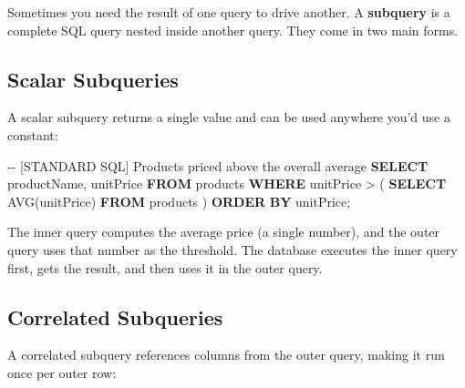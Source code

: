 \documentclass[
  letterpaper,
  DIV=11,
  numbers=noendperiod]{scrreprt}
\newenvironment{Shaded}{\begin{snugshade}}{\end{snugshade}}
\newcommand{\CommentTok}[1]{\textcolor[rgb]{0.37,0.37,0.37}{#1}}
\newcommand{\FunctionTok}[1]{\textcolor[rgb]{0.28,0.35,0.67}{#1}}
\newcommand{\KeywordTok}[1]{\textcolor[rgb]{0.00,0.23,0.31}{\textbf{#1}}}
\newcommand{\NormalTok}[1]{\textcolor[rgb]{0.00,0.23,0.31}{#1}}
\newcommand{\OperatorTok}[1]{\textcolor[rgb]{0.37,0.37,0.37}{#1}}
\begin{document}
Sometimes you need the result of one query to drive another. A
\textbf{subquery} is a complete SQL query nested inside another query.
They come in two main forms.

\subsection{Scalar Subqueries}\label{scalar-subqueries}

A scalar subquery returns a single value and can be used anywhere you'd
use a constant:

\begin{codelisting}

\caption{\texttt{duckdb}}

\begin{Shaded}
\begin{Highlighting}[]
\CommentTok{{-}{-} [STANDARD SQL] Products priced above the overall average}
\KeywordTok{SELECT}
\NormalTok{    productName,}
\NormalTok{    unitPrice}
\KeywordTok{FROM}\NormalTok{ products}
\KeywordTok{WHERE}\NormalTok{ unitPrice }\OperatorTok{\textgreater{}}\NormalTok{ (}
    \KeywordTok{SELECT} \FunctionTok{AVG}\NormalTok{(unitPrice) }\KeywordTok{FROM}\NormalTok{ products}
\NormalTok{)}
\KeywordTok{ORDER} \KeywordTok{BY}\NormalTok{ unitPrice;}
\end{Highlighting}
\end{Shaded}

\end{codelisting}

The inner query computes the average price (a single number), and the
outer query uses that number as the threshold. The database executes the
inner query first, gets the result, and then uses it in the outer query.

\subsection{Correlated Subqueries}\label{correlated-subqueries}

A correlated subquery references columns from the outer query, making it
run once per outer row:
\end{document}
